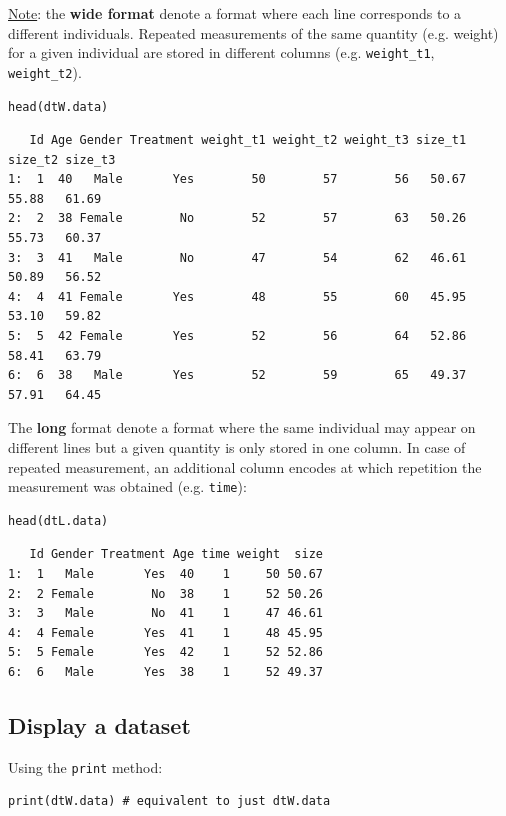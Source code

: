 \documentclass{article}
\begin{document}
\bigskip

\uline{Note}: the \textbf{wide format} denote a format where each line corresponds
to a different individuals. Repeated measurements of the same quantity
(e.g. weight) for a given individual are stored in different columns
(e.g. \texttt{weight\_t1}, \texttt{weight\_t2}).

\lstset{language=r,label= ,caption= ,captionpos=b,numbers=none}
\begin{lstlisting}
head(dtW.data)
\end{lstlisting}

\begin{verbatim}
   Id Age Gender Treatment weight_t1 weight_t2 weight_t3 size_t1 size_t2 size_t3
1:  1  40   Male       Yes        50        57        56   50.67   55.88   61.69
2:  2  38 Female        No        52        57        63   50.26   55.73   60.37
3:  3  41   Male        No        47        54        62   46.61   50.89   56.52
4:  4  41 Female       Yes        48        55        60   45.95   53.10   59.82
5:  5  42 Female       Yes        52        56        64   52.86   58.41   63.79
6:  6  38   Male       Yes        52        59        65   49.37   57.91   64.45
\end{verbatim}

 The \textbf{long} format denote a format where the same individual may
appear on different lines but a given quantity is only stored in one
column. In case of repeated measurement, an additional column encodes
at which repetition the measurement was obtained (e.g. \texttt{time}):
\lstset{language=r,label= ,caption= ,captionpos=b,numbers=none}
\begin{lstlisting}
head(dtL.data)
\end{lstlisting}

\begin{verbatim}
   Id Gender Treatment Age time weight  size
1:  1   Male       Yes  40    1     50 50.67
2:  2 Female        No  38    1     52 50.26
3:  3   Male        No  41    1     47 46.61
4:  4 Female       Yes  41    1     48 45.95
5:  5 Female       Yes  42    1     52 52.86
6:  6   Male       Yes  38    1     52 49.37
\end{verbatim}

\subsection{Display a dataset}
\label{sec:org6228fc5}

Using the \texttt{print} method:
\lstset{language=r,label= ,caption= ,captionpos=b,numbers=none}
\begin{lstlisting}
print(dtW.data) # equivalent to just dtW.data
\end{lstlisting}
\end{document}
